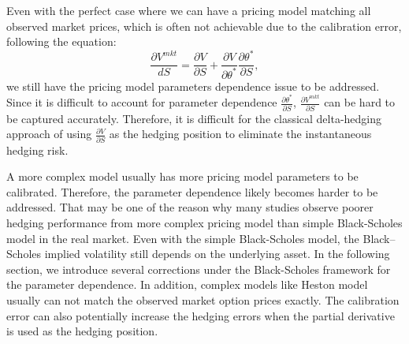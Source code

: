 \documentclass[letterpaper,12pt,titlepage,oneside,final]{book}
\numberwithin{equation}{section}
\theoremstyle{definition}
\newcommand{\Vmkt}{V^{mkt}}
\begin{document}
Even with the perfect case where we can have a pricing model matching all observed market prices, which is often not achievable due to the calibration error, following the equation:
\begin{equation} \label{mkt:d}
    \frac{\partial \Vmkt}{d S}=\frac{\partial V}{\partial S} + \frac{\partial V}{\partial \theta^*}\frac{\partial \theta^*}{\partial S},
\end{equation}
we still have  the pricing model parameters dependence issue to be addressed. Since it is difficult to account for parameter dependence $\frac{\partial \theta^*}{\partial S}$,  $\frac{\partial \Vmkt}{\partial S} $ can be hard to be captured accurately. Therefore, it is difficult for the classical delta-hedging approach of using $\frac{\partial V}{\partial S}$ as the hedging position to  eliminate the instantaneous hedging risk.

A more complex model usually has more pricing model parameters to be calibrated. Therefore, the parameter dependence likely becomes harder to be addressed. That may be one of the reason why many studies observe poorer hedging performance from more complex pricing model than simple Black-Scholes model in the real market. Even with the simple Black-Scholes model, the Black–Scholes implied volatility still depends on the underlying asset. In the following section, we introduce several corrections under the Black-Scholes framework for the parameter dependence. In addition, complex models like Heston model usually can not match the observed market option prices exactly. The calibration error can also potentially increase the hedging errors when the partial derivative is used as the hedging position.  
\end{document}
